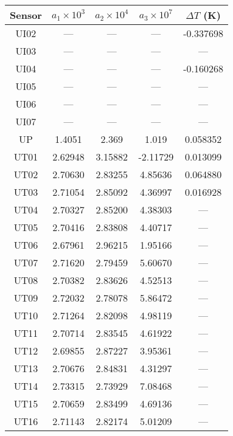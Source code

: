 \documentclass[utf8]{article}
\begin{document}
\begin{table}
{\begin{minipage}{85mm}
        \begin{tabular}{ccccc}
          \hline
          Sensor & $a_1\times10^{3}$ & $a_2\times10^{4}$
                 & $a_3\times10^{7}$ & $\Delta T$ (K) \\
          \hline
          UI02 &   ---   &   ---   &   ---   & -0.337698 \\
          UI03 &   ---   &   ---   &   ---   &     ---   \\
          UI04 &   ---   &   ---   &   ---   & -0.160268 \\
          UI05 &   ---   &   ---   &   ---   &     ---   \\
          UI06 &   ---   &   ---   &   ---   &     ---   \\
          UI07 &   ---   &   ---   &   ---   &     ---   \\
          UP   & 1.4051  & 2.369   & 1.019   &  0.058352 \\
          UT01 & 2.62948 & 3.15882 &-2.11729 &  0.013099 \\
          UT02 & 2.70630 & 2.83255 & 4.85636 &  0.064880 \\
          UT03 & 2.71054 & 2.85092 & 4.36997 &  0.016928 \\
          UT04 & 2.70327 & 2.85200 & 4.38303 &     ---   \\
          UT05 & 2.70416 & 2.83808 & 4.40717 &     ---   \\
          UT06 & 2.67961 & 2.96215 & 1.95166 &     ---   \\
          UT07 & 2.71620 & 2.79459 & 5.60670 &     ---   \\
          UT08 & 2.70382 & 2.83626 & 4.52513 &     ---   \\
          UT09 & 2.72032 & 2.78078 & 5.86472 &     ---   \\
          UT10 & 2.71264 & 2.82098 & 4.98119 &     ---   \\
          UT11 & 2.70714 & 2.83545 & 4.61922 &     ---   \\
          UT12 & 2.69855 & 2.87227 & 3.95361 &     ---   \\
          UT13 & 2.70676 & 2.84831 & 4.31297 &     ---   \\
          UT14 & 2.73315 & 2.73929 & 7.08468 &     ---   \\
          UT15 & 2.70659 & 2.83499 & 4.69136 &     ---   \\
          UT16 & 2.71143 & 2.82174 & 5.01209 &     ---   \\
          \hline
        \end{tabular}
      \end{minipage}}
    \end{table}
\end{document}
